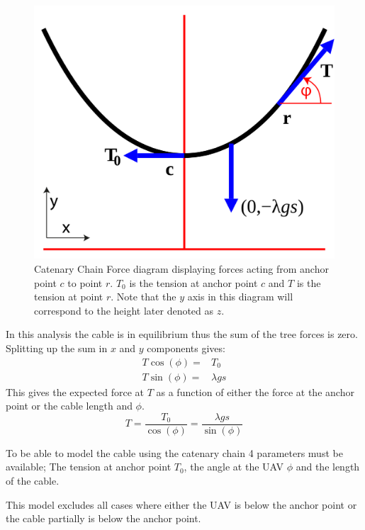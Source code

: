 \begin{figure}[H]
\centering
\includegraphics[scale=0.25]{graphics/CatenaryForceDiagram.png}
\caption{Catenary Chain Force diagram displaying forces acting from anchor point $c$ to point $r$. $T_0$ is the tension at anchor point $c$ and $T$ is the tension at point $r$. Note that the $y$ axis in this diagram will correspond to the height later denoted as $z$.}
\label{fig:catenary_force_diagram}
\end{figure}

\noindent
In this analysis the cable is in equilibrium thus the sum of the tree forces is zero. Splitting up the sum in $x$ and $y$ components gives:
\begin{eqnarray}
T\cos(\phi) =& T_0 \\
T \sin(\phi) =& \lambda g s
\end{eqnarray}
This gives the expected force at $T$ as a function of either the force at the anchor point or the cable length and $\phi$.
\begin{equation}
T = \frac{T_0}{\cos(\phi)} = \frac{\lambda g s}{\sin(\phi)}
\end{equation}

To be able to model the cable using the catenary chain 4 parameters must be available; The tension at anchor point $T_0$, the angle at the UAV $\phi$ and the length of the cable.

\noindent
This model excludes all cases where either the UAV is below the anchor point or the cable partially is below the anchor point.



